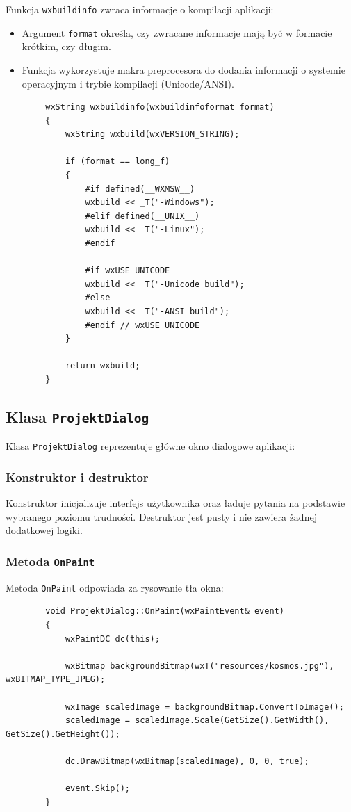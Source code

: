 \documentclass[]{article}
\begin{document}
	Funkcja \texttt{wxbuildinfo} zwraca informacje o kompilacji aplikacji:
	
	\begin{itemize}
		\item Argument \texttt{format} określa, czy zwracane informacje mają być w formacie krótkim, czy długim.
		\item Funkcja wykorzystuje makra preprocesora do dodania informacji o systemie operacyjnym i trybie kompilacji (Unicode/ANSI).
	\end{itemize}
	
	\begin{verbatim}
		wxString wxbuildinfo(wxbuildinfoformat format)
		{
			wxString wxbuild(wxVERSION_STRING);
			
			if (format == long_f)
			{
				#if defined(__WXMSW__)
				wxbuild << _T("-Windows");
				#elif defined(__UNIX__)
				wxbuild << _T("-Linux");
				#endif
				
				#if wxUSE_UNICODE
				wxbuild << _T("-Unicode build");
				#else
				wxbuild << _T("-ANSI build");
				#endif // wxUSE_UNICODE
			}
			
			return wxbuild;
		}
	\end{verbatim}
	
	\subsection{Klasa \texttt{ProjektDialog}}
	
	Klasa \texttt{ProjektDialog} reprezentuje główne okno dialogowe aplikacji:
	
	\subsubsection{Konstruktor i destruktor}
	
	Konstruktor inicjalizuje interfejs użytkownika oraz ładuje pytania na podstawie wybranego poziomu trudności. Destruktor jest pusty i nie zawiera żadnej dodatkowej logiki.
	
	\subsubsection{Metoda \texttt{OnPaint}}
	
	Metoda \texttt{OnPaint} odpowiada za rysowanie tła okna:
	
	\begin{verbatim}
		void ProjektDialog::OnPaint(wxPaintEvent& event)
		{
			wxPaintDC dc(this);
			
			wxBitmap backgroundBitmap(wxT("resources/kosmos.jpg"), wxBITMAP_TYPE_JPEG);
			
			wxImage scaledImage = backgroundBitmap.ConvertToImage();
			scaledImage = scaledImage.Scale(GetSize().GetWidth(), GetSize().GetHeight());
			
			dc.DrawBitmap(wxBitmap(scaledImage), 0, 0, true);
			
			event.Skip();
		}
	\end{verbatim}
	
\end{document}
